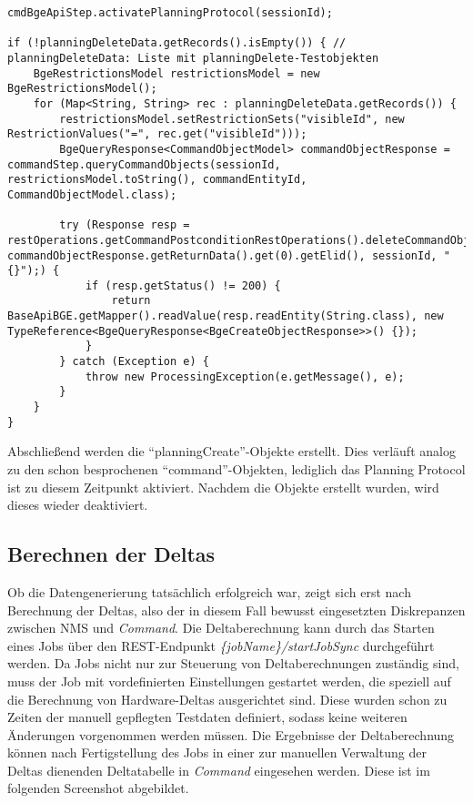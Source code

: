 \begin{lstlisting}[caption=Löschen von \enquote{planningDelete}-Objekten über die BGE, label=deletePlanningDeleteTestObjects,style=Javastyle]
cmdBgeApiStep.activatePlanningProtocol(sessionId);

if (!planningDeleteData.getRecords().isEmpty()) { // planningDeleteData: Liste mit planningDelete-Testobjekten
    BgeRestrictionsModel restrictionsModel = new BgeRestrictionsModel();
    for (Map<String, String> rec : planningDeleteData.getRecords()) {
        restrictionsModel.setRestrictionSets("visibleId", new RestrictionValues("=", rec.get("visibleId")));
        BgeQueryResponse<CommandObjectModel> commandObjectResponse = commandStep.queryCommandObjects(sessionId, restrictionsModel.toString(), commandEntityId, CommandObjectModel.class);

        try (Response resp = restOperations.getCommandPostconditionRestOperations().deleteCommandObject(commandEntityId, commandObjectResponse.getReturnData().get(0).getElid(), sessionId, "{}");) {
            if (resp.getStatus() != 200) {
                return BaseApiBGE.getMapper().readValue(resp.readEntity(String.class), new TypeReference<BgeQueryResponse<BgeCreateObjectResponse>>() {});
            }
        } catch (Exception e) {
            throw new ProcessingException(e.getMessage(), e);
        }
    }
}
\end{lstlisting}

Abschließend werden die \enquote{planningCreate}-Objekte erstellt. Dies verläuft analog zu den schon besprochenen \enquote{command}-Objekten, lediglich das Planning Protocol ist zu diesem Zeitpunkt aktiviert. Nachdem die Objekte erstellt wurden, wird dieses wieder deaktiviert.

\subsection{Berechnen der Deltas}\label{subsec:calculatingDeltas}
Ob die Datengenerierung tatsächlich erfolgreich war, zeigt sich erst nach Berechnung der Deltas, also der in diesem Fall bewusst eingesetzten Diskrepanzen zwischen \ac{NMS} und \textit{Command}. Die Deltaberechnung kann durch das Starten eines Jobs über den \ac{REST}-Endpunkt \textit{\{jobName\}/startJobSync} durchgeführt werden. Da Jobs nicht nur zur Steuerung von Deltaberechnungen zuständig sind, muss der Job mit vordefinierten Einstellungen gestartet werden, die speziell auf die Berechnung von Hardware-Deltas ausgerichtet sind. Diese wurden schon zu Zeiten der manuell gepflegten Testdaten definiert, sodass keine weiteren Änderungen vorgenommen werden müssen. Die Ergebnisse der Deltaberechnung können nach Fertigstellung des Jobs in einer zur manuellen Verwaltung der Deltas dienenden Deltatabelle in \textit{Command} eingesehen werden. Diese ist im folgenden Screenshot abgebildet.

